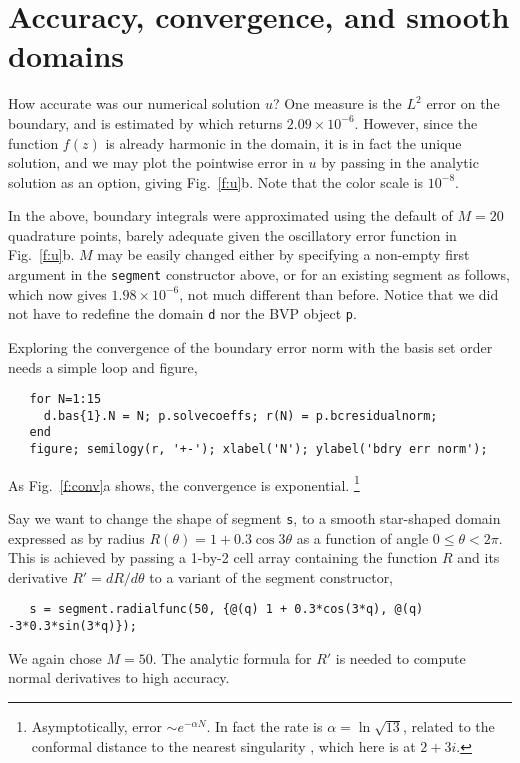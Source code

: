 \documentclass[11pt]{article}
\begin{document}
\section{Accuracy, convergence, and smooth domains}

How accurate was our numerical solution $u$? One measure is the
$L^2$ error on the boundary, and is estimated by
which returns $2.09 \times 10^{-6}$.
However, since the function $f(z)$ is already harmonic in the domain,
it is in fact the unique solution, and we may plot the
pointwise error in $u$ by passing in the analytic solution as an option,
giving Fig.~\ref{f:u}b. Note that the color scale is $10^{-8}$.

In the above, boundary integrals were approximated using the default of
$M=20$ quadrature points, barely adequate given the
oscillatory error function in Fig.~\ref{f:u}b.
$M$ may be easily changed either by specifying
a non-empty first argument in the {\tt segment} constructor above, or
for an existing segment as follows,
which now gives $1.98\times 10^{-6}$, not much different than before.
Notice that we did not have to redefine the domain {\tt d} nor
the BVP object {\tt p}.

Exploring the convergence of the boundary error norm with the basis set order
needs a simple loop and figure,
\begin{verbatim}
   for N=1:15
     d.bas{1}.N = N; p.solvecoeffs; r(N) = p.bcresidualnorm;
   end
   figure; semilogy(r, '+-'); xlabel('N'); ylabel('bdry err norm');
\end{verbatim}
As Fig.~\ref{f:conv}a shows, the convergence is exponential.%
  \footnote{Asymptotically, error $\sim e^{-\alpha N}$. In fact the rate is
    $\alpha = \ln \sqrt{13}$, related to the conformal distance to
    the nearest singularity \cite{timothesis}, which here is at $2+3i$.}

Say we want to change the shape of segment {\tt s}, to
a smooth star-shaped domain expressed as by radius $R(\theta) =
1 + 0.3\cos 3\theta$ as a function of angle $0\le \theta< 2\pi$.
This is achieved by passing a 1-by-2
cell array containing the function $R$ and its
derivative $R' = dR/d\theta$ to a variant of the segment constructor,
\begin{verbatim}
   s = segment.radialfunc(50, {@(q) 1 + 0.3*cos(3*q), @(q) -3*0.3*sin(3*q)});
\end{verbatim}
We again chose $M=50$.
The analytic formula for $R'$ is needed to compute normal derivatives
to high accuracy.
\end{document}
